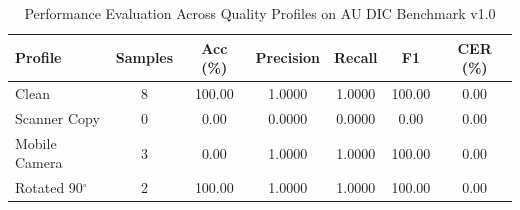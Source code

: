 \begin{table}[htbp]
\caption{Performance Evaluation Across Quality Profiles on AU DIC Benchmark v1.0}
\label{tab:profile_degradation}
\centering
\begin{tabular}{lcccccc}
\hline
\textbf{Profile} & \textbf{Samples} & \textbf{Acc (\%)} & \textbf{Precision} & \textbf{Recall} & \textbf{F1} & \textbf{CER (\%)} \\
\hline
Clean & 8 & 100.00 & 1.0000 & 1.0000 & 100.00 & 0.00 \\
Scanner Copy & 0 & 0.00 & 0.0000 & 0.0000 & 0.00 & 0.00 \\
Mobile Camera & 3 & 0.00 & 1.0000 & 1.0000 & 100.00 & 0.00 \\
Rotated 90$^\circ$ & 2 & 100.00 & 1.0000 & 1.0000 & 100.00 & 0.00 \\
\hline
\end{tabular}
\end{table}